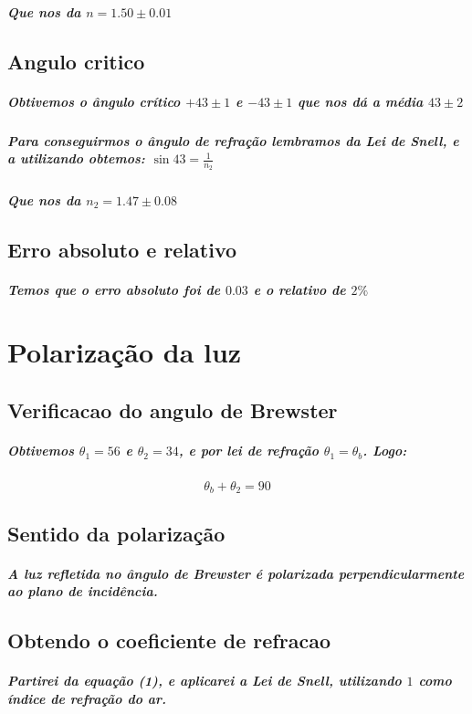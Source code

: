 \documentclass[12pt,twoside, a4paper, twocolumn]{article}
\begin{document}
\subparagraph*{Que nos da $n = 1.50 \pm 0.01$}

\subsection{Angulo critico}

\subparagraph*{Obtivemos o ângulo crítico $+43 \pm 1$ e $-43 \pm 1$ que nos dá a média $43 \pm 2$}

\subparagraph*{Para conseguirmos o ângulo de refração lembramos da \emph{Lei de Snell}, e a utilizando obtemos: $\sin{43} = \frac{1}{n_2}$}

\subparagraph*{Que nos da $n_2 = 1.47 \pm 0.08$}

\subsection{Erro absoluto e relativo}

\subparagraph*{Temos que o erro absoluto foi de $0.03$ e o relativo de $2\%$}

\section{Polarização da luz}


\subsection{Verificacao do angulo de Brewster}
\subparagraph*{Obtivemos $\theta_1 = 56$ e $\theta_2 = 34$, e por lei de refração $\theta_1 = \theta_b$. Logo:}

\begin{equation}
  \theta_b + \theta_2 = 90
\end{equation}

\subsection{Sentido da polarização}

\subparagraph*{A luz refletida no ângulo de Brewster é polarizada perpendicularmente ao plano de incidência.}

\subsection{Obtendo o coeficiente de refracao}

\subparagraph*{Partirei da equação (1), e aplicarei a \emph{Lei de Snell}, utilizando $1$ como índice de refração do ar.}
\end{document}
